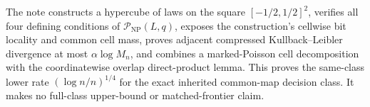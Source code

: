 The note constructs a hypercube of laws on the square \([-1/2,1/2]^2\), verifies all four defining conditions of \(\mathcal P_{\mathrm{NP}}(L,q)\), exposes the construction's cellwise bit locality and common cell mass, proves adjacent compressed Kullback--Leibler divergence at most \(\alpha\log M_n\), and combines a marked-Poisson cell decomposition with the coordinatewise overlap direct-product lemma.  This proves the same-class lower rate \((\log n/n)^{1/4}\) for the exact inherited common-map decision class.  It makes no full-class upper-bound or matched-frontier claim.